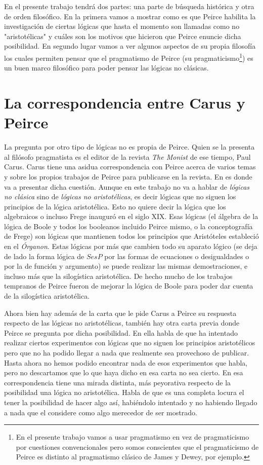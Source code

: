\documentclass[
  structure  = article,
  pagelayout = periodicalaureo,%
  secfont    = italic,
  subsecfont = italic,
  version    = final,%
]{suftesi}
\begin{document}
En el presente trabajo tendrá dos partes: una parte de búsqueda histórica y otra de orden filosófico. En la primera vamos a mostrar como es que Peirce habilita la investigación de ciertas lógicas que hasta el momento son llamadas como no "aristotélicas" y cuáles son los motivos que hicieron que Peirce enuncie dicha posibilidad. En segundo lugar vamos a ver algunos aspectos de su propia filosofía los cuales permiten pensar que el pragmatismo de Peirce (su pragmaticismo\footnote{En el presente trabajo vamos a usar pragmatismo en vez de pragmaticismo por cuestiones convencionales pero somos conscientes que el pragmaticismo de Peirce es distinto al pragmatismo clásico de James y Dewey, por ejemplo.}) es un buen marco filosófico para poder pensar las lógicas no clásicas.

\section{La correspondencia entre Carus y Peirce} %
\label{sec:La correspondencia entre Carus y Peirce}

La pregunta por otro tipo de lógicas no es propia de Peirce. Quien se la presenta al filósofo pragmatista es el editor de la revista \emph{The Monist} de ese tiempo, Paul Carus. Carus tiene una asidua correspondencia con Peirce acerca de varios temas y sobre los propios trabajos de Peirce para publicarse en la revista. En \cite{carus1910a} es donde va a presentar dicha cuestión. Aunque en este trabajo no va a hablar de \emph{lógicas no clásica} sino de \emph{lógicas no aristotélicas}, es decir lógicas que no siguen los principios de la lógica aristotélica. Esto no quiere decir la lógica que los algebraicos o incluso Frege inauguró en el siglo XIX. Esas lógicas (el álgebra de la lógica de Boole y todos los booleanos incluido Peirce mismo, o la conceptografía de Frege) son lógicas que mantienen todos los principios que Aristóteles estableció en el \emph{Órganon}. Estas lógicas por más que cambien todo su aparato lógico (se deja de lado la forma lógica de $S es P$ por las formas de ecuaciones o desigualdades o por la de función y argumento) se puede realizar las mismas demostraciones, e incluso más que la silogística aristotélica. De hecho mucho de los trabajos tempranos de Peirce fueron de mejorar la lógica de Boole para poder dar cuenta de la silogística aristotélica.

Ahora bien hay además de la carta que le pide Carus a Peirce su respuesta respecto de las lógicas no aristotélicas, también hay otra carta previa donde Peirce se pregunta por dicha posibilidad. En ella habla de que ha intentado realizar ciertos experimentos con lógicas que no siguen los principios aristotélicos pero que no ha podido llegar a nada que realmente sea provechoso de publicar. Hasta ahora no hemos podido encontrar nada de esos experimentos que habla, pero no descartamos que lo que haya dicho en esa carta no sea cierto. En esa correspondencia tiene una mirada distinta, más peyorativa respecto de la posibilidad una lógica no aristotélica. Habla de que es una completa locura el tener la posibilidad de hacer algo así, habiéndolo intentado y no habiendo llegado a nada que el considere como algo merecedor de ser mostrado. 
\end{document}
